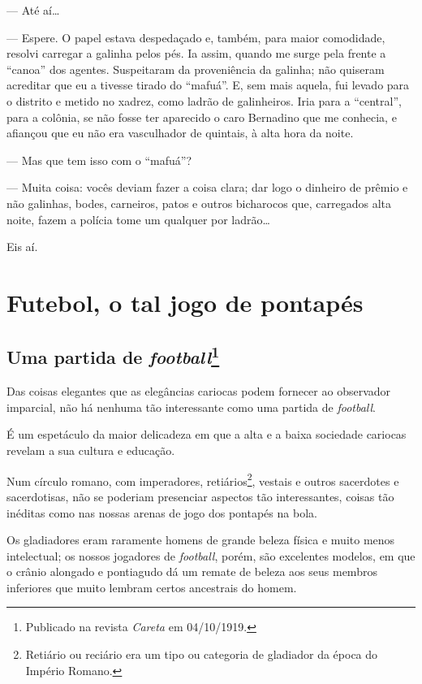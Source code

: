 --- Até aí\ldots{}

--- Espere. O papel estava despedaçado e, também, para maior comodidade,
resolvi carregar a galinha pelos pés. Ia assim, quando me surge pela
frente a ``canoa'' dos agentes. Suspeitaram da proveniência da galinha;
não quiseram acreditar que eu a tivesse tirado do ``mafuá''. E, sem mais
aquela, fui levado para o distrito e metido no xadrez, como ladrão de
galinheiros. Iria para a ``central'', para a colônia, se não fosse ter
aparecido o caro Bernadino que me conhecia, e afiançou que eu não era
vasculhador de quintais, à alta hora da noite.

--- Mas que tem isso com o ``mafuá''?

--- Muita coisa: vocês deviam fazer a coisa clara; dar logo o dinheiro de
prêmio e não galinhas, bodes, carneiros, patos e outros bicharocos que,
carregados alta noite, fazem a polícia tome um qualquer por ladrão\ldots{}

Eis aí.


\part{Futebol, o tal jogo de pontapés}

\chapter[Uma partida de \emph{football}]{Uma partida de \emph{football}\footnote[*]{Publicado na revista \emph{Careta} em 04/10/1919.}}

Das coisas elegantes que as elegâncias cariocas podem fornecer ao
observador imparcial, não há nenhuma tão interessante como uma partida
de \emph{football}.

É um espetáculo da maior delicadeza em que a alta e a baixa sociedade
cariocas revelam a sua cultura e educação.

Num círculo romano, com imperadores, retiários\footnote{Retiário ou
  reciário era um tipo ou categoria de gladiador da época do Império
  Romano.}, vestais e outros sacerdotes e sacerdotisas, não se poderiam
presenciar aspectos tão interessantes, coisas tão inéditas como nas
nossas arenas de jogo dos pontapés na bola.

Os gladiadores eram raramente homens de grande beleza física e muito
menos intelectual; os nossos jogadores de \emph{football}, porém, são
excelentes modelos, em que o crânio alongado e pontiagudo dá um remate
de beleza aos seus membros inferiores que muito lembram certos
ancestrais do homem.

